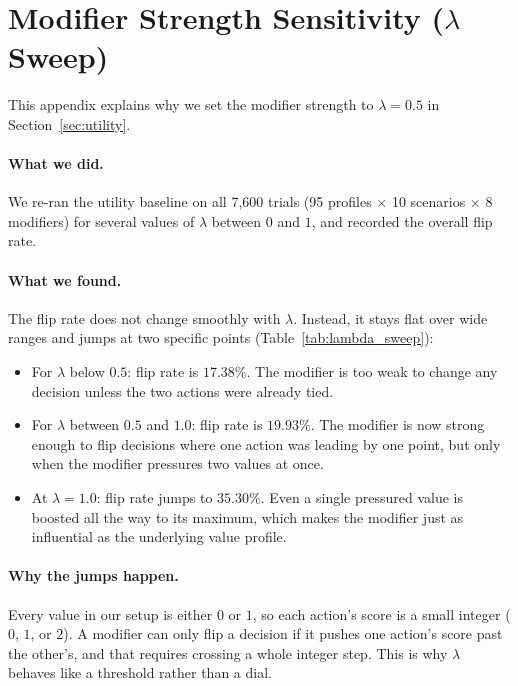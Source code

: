 \documentclass[11pt]{article}
\begin{document}
\section{Modifier Strength Sensitivity ($\lambda$ Sweep)}
\label{app:lambda_sweep}

This appendix explains why we set the modifier strength to $\lambda = 0.5$ in Section~\ref{sec:utility}.

\paragraph{What we did.} We re-ran the utility baseline on all 7{,}600 trials (95 profiles $\times$ 10 scenarios $\times$ 8 modifiers) for several values of $\lambda$ between $0$ and $1$, and recorded the overall flip rate.

\paragraph{What we found.} The flip rate does not change smoothly with $\lambda$. Instead, it stays flat over wide ranges and jumps at two specific points (Table~\ref{tab:lambda_sweep}):
\begin{itemize}[leftmargin=*, noitemsep, topsep=2pt, partopsep=0pt, parsep=0pt]
  \item For $\lambda$ below $0.5$: flip rate is $17.38\%$. The modifier is too weak to change any decision unless the two actions were already tied.
  \item For $\lambda$ between $0.5$ and $1.0$: flip rate is $19.93\%$. The modifier is now strong enough to flip decisions where one action was leading by one point, but only when the modifier pressures two values at once.
  \item At $\lambda = 1.0$: flip rate jumps to $35.30\%$. Even a single pressured value is boosted all the way to its maximum, which makes the modifier just as influential as the underlying value profile.
\end{itemize}

\paragraph{Why the jumps happen.} Every value in our setup is either $0$ or $1$, so each action's score is a small integer ($0$, $1$, or $2$). A modifier can only flip a decision if it pushes one action's score past the other's, and that requires crossing a whole integer step. This is why $\lambda$ behaves like a threshold rather than a dial.
\end{document}

